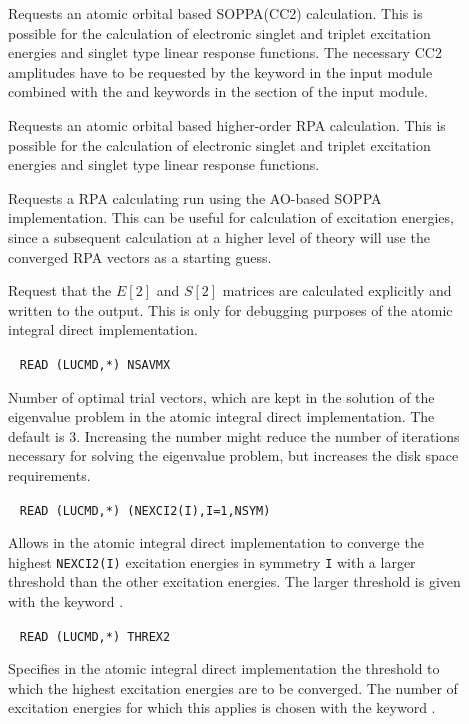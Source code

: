 \begin{description}
\item[] Requests an atomic orbital based SOPPA(CC2)
calculation. This is possible for the calculation of
electronic singlet and triplet excitation energies and singlet type 
linear response functions.
The necessary CC2 amplitudes have to be requested by the  keyword 
in the  input module combined with the  and
 keywords in the  section of the  input module.

\item[] Requests an atomic orbital based higher-order RPA
calculation. This is possible for the calculation of
electronic singlet and triplet excitation energies and singlet type 
linear response functions. 

\item[] Requests a RPA calculating run using the AO-based 
SOPPA implementation. This can be useful for calculation of excitation 
energies, since a subsequent calculation at a higher level of theory will 
use the converged RPA vectors as a starting guess.

\item[] Request that the $E[2]$ and $S[2]$ matrices are
calculated explicitly and written to the output. This is only for
debugging purposes of the atomic integral direct implementation.

\item[]\verb| |\newline
\verb|READ (LUCMD,*) NSAVMX|

Number of optimal trial vectors, which are kept in the solution of the
eigenvalue problem in the atomic integral direct implementation. The
default is 3. Increasing the number might reduce the number of
iterations necessary for solving the eigenvalue problem, but increases
the disk space requirements.

\item[]\verb| |\newline
\verb|READ (LUCMD,*) (NEXCI2(I),I=1,NSYM)|

Allows in the atomic integral direct implementation to converge the
highest \verb|NEXCI2(I)| excitation energies in symmetry \verb|I| with
a larger threshold than the other excitation energies. The larger
threshold is given with the keyword .

\item[]\verb| |\newline
\verb|READ (LUCMD,*) THREX2|

Specifies in the atomic integral direct implementation the threshold to
which the highest excitation energies are to be converged. The number
of excitation energies for which this applies is chosen with the
keyword .

\end{description}

